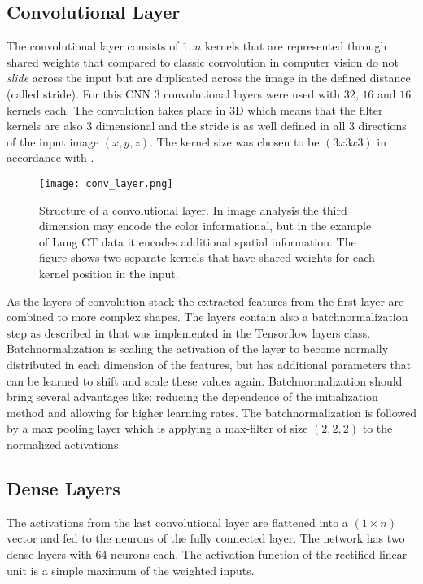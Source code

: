 \documentclass[main.tex]{subfiles}
\begin{document}
\subsection{Convolutional Layer}
The convolutional layer consists of $1..n$ kernels that are represented through shared weights that compared to classic convolution in computer vision do not \emph{slide} across the input but are duplicated across the image in the defined distance (called stride). For this CNN $3$ convolutional layers were used with $32$, $16$ and $16$ kernels each. The convolution takes place in 3D which means that the filter kernels are also 3 dimensional and the stride is as well defined in all 3 directions of the input image $(x,y,z)$. The kernel size was chosen to be $(3x3x3)$ in accordance with \cite{huang2017lung}. 

\begin{figure}
\begin{center}
\texttt{[image: conv\_layer.png]}
\end{center}
\caption{Structure of a convolutional layer. In image analysis the third dimension may encode the color informational, but in the example of Lung CT data it encodes additional spatial information. The figure shows two separate kernels that have shared weights for each kernel position in the input.}
\label{fig:conv_layer}
\end{figure}

As the layers of convolution stack the extracted features from the first layer are combined to more complex shapes. The layers contain also a batchnormalization step as described in \cite{ioffe2015batch} that was implemented in the Tensorflow layers class. Batchnormalization is scaling the activation of the layer to become normally distributed in each dimension of the features, but has additional parameters that can be learned to shift and scale these values again. Batchnormalization should bring several advantages like: reducing the dependence of the initialization method and allowing for higher learning rates. The batchnormalization is followed by a max pooling layer which is applying a max-filter of size $(2,2,2)$ to the normalized activations.


\subsection{Dense Layers}
The activations from the last convolutional layer are flattened into a $(1 \times n)$ vector and fed to the neurons of the fully connected layer. The network has two dense layers with $64$ neurons each. The activation function of the rectified linear unit is a simple maximum of the weighted inputs.
\end{document}
